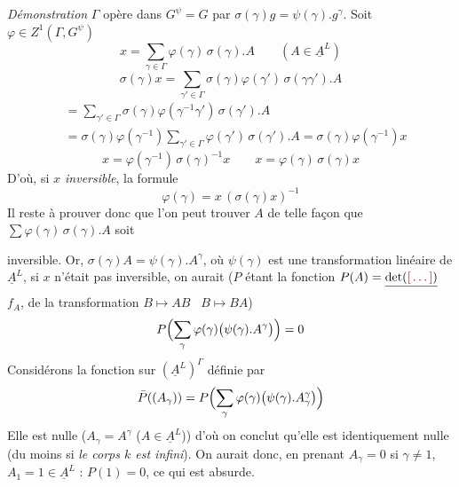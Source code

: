 \documentclass[11pt,a4paper]{article}
\begin{document}
\emph{Démonstration} \quad $\Gamma$ opère dans $G^{\psi} = G$ par
$\sigma(\gamma)g = \psi(\gamma).g^{\gamma}$. Soit $\varphi \in Z^1(\Gamma,
G^{\psi})$ 
\[
  x = \sum_{\gamma \in \Gamma} \varphi(\gamma)\,
  \sigma(\gamma).A \qquad (A \in \underline{A}^{L})
\]
\struck{\ill{} \ill{} \ill{}, $\sigma(\gamma)$ \ill{} \ill{} \ill{} \ill{}}
\[
  \sigma(\gamma)x = \sum_{\gamma' \in \Gamma}
    \sigma(\gamma)\varphi(\gamma')\,\sigma(\gamma\gamma').A
\]
\begin{align*}
  &= \sum_{\gamma' \in \Gamma} \sigma(\gamma)\varphi(\gamma^{-1}\gamma')\,
    \sigma(\gamma').A \\
  &= \sigma(\gamma)\varphi(\gamma^{-1}) \sum_{\gamma' \in \Gamma}
    \varphi(\gamma')\,\sigma(\gamma').A = \sigma(\gamma)\varphi(\gamma^{-1})x
\end{align*}
\[
  x = \varphi(\gamma^{-1})\,\sigma(\gamma)^{-1}x \qquad
  x = \varphi(\gamma)\,\sigma(\gamma)x
\]
\struck{$\varphi(\gamma) =$} D'où, si \emph{$x$ inversible}, la formule
\[
  \varphi(\gamma) = x\,(\sigma(\gamma)x)^{-1}
\]
Il reste à prouver donc que l'on peut trouver $A$ de telle façon que
$\sum \varphi(\gamma)\,\sigma(\gamma).A$ soit


inversible. Or, $\sigma(\gamma)A = \psi(\gamma).A^{\gamma}$, où $\psi(\gamma)$
est une transformation linéaire de $\underline{A}^{L}$, si $x$ n'était pas
inversible, on aurait ($P$ étant la fonction 
$P(A) = \struck{\det(\ill{})}$  $f_A$, 
de la transformation $B \mapsto AB$ \ $B \mapsto BA$)
\[
  P\Bigl(\sum_{\gamma} \varphi(\gamma)\bigl(\psi(\gamma).A^{\gamma}\bigr)\Bigr) = 0
\]
Considérons la fonction sur $(\underline{A}^{L})^{\Gamma}$ définie par
\[
  \bar{P}((A_\gamma)) = P\Bigl(\sum_{\gamma} \varphi(\gamma)\bigl(\psi(\gamma).
  A_{\gamma}^{\gamma}\bigr)\Bigr)
\]
Elle est nulle  
($A_\gamma = A^{\gamma}$ ($A \in \underline{A}^{L}$)) d'où on conclut qu'elle
est identiquement nulle (du moins si \emph{le corps $k$ est infini}).
On aurait donc, en prenant $A_\gamma = 0$ si $\gamma \neq 1$, $A_1 = 1 \in
\underline{A}^{L}$ : $P(1) = 0$, ce qui est absurde.
\end{document}
